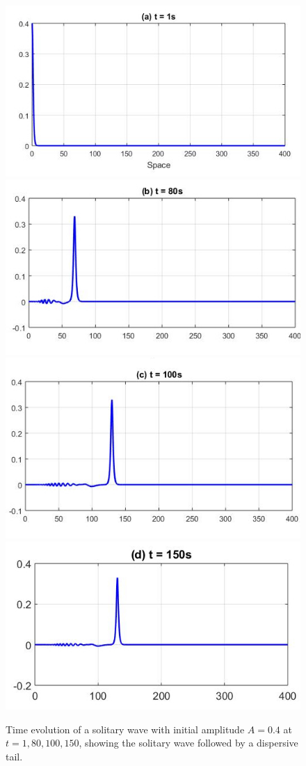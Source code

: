 \documentclass[alpha-refs, 12pt]{wiley-article}
\begin{document}
\begin{figure}
  \centering
  \includegraphics[width=0.6\linewidth]{figs/t1.jpg}
  \includegraphics[width=0.6\linewidth]{figs/t80.jpg}
  \includegraphics[width=0.6\linewidth]{figs/t100.jpg}
  \includegraphics[width=0.65\linewidth]{figs/t150.jpg}
  \caption{Time evolution of a solitary wave with initial amplitude $A = 0.4$ at $t = 1, 80, 100, 150$, showing the solitary wave followed by a dispersive tail.}
  \label{fig:3.7}
\end{figure}
\end{document}
